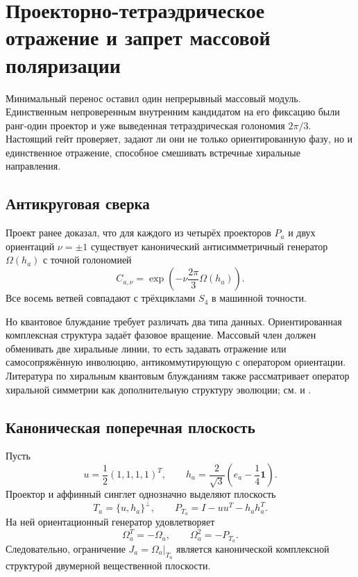 \chapter{Проекторно-тетраэдрическое отражение и запрет массовой поляризации}

Минимальный перенос оставил один непрерывный массовый модуль. Единственным
непроверенным внутренним кандидатом на его фиксацию были ранг-один проектор
и уже выведенная тетраэдрическая голономия $2\pi/3$. Настоящий гейт
проверяет, задают ли они не только ориентированную фазу, но и единственное
отражение, способное смешивать встречные хиральные направления.

\section{Антикруговая сверка}

Проект ранее доказал, что для каждого из четырёх проекторов $P_a$ и двух
ориентаций $\nu=\pm1$ существует канонический антисимметричный генератор
$\Omega(h_a)$ с точной голономией
\begin{equation}
 C_{a,\nu}=\exp\!\left(-\nu\frac{2\pi}{3}\Omega(h_a)\right).
 \label{eq:v5-tetra-holonomy}
\end{equation}
Все восемь ветвей совпадают с трёхциклами $S_4$ в машинной точности.

Но квантовое блуждание требует различать два типа данных. Ориентированная
комплексная структура задаёт фазовое вращение. Массовый член должен
обменивать две хиральные линии, то есть задавать отражение или
самосопряжённую инволюцию, антикоммутирующую с оператором ориентации.
Литература по хиральным квантовым блужданиям также рассматривает оператор
хиральной симметрии как дополнительную структуру эволюции; см.
 и .

\section{Каноническая поперечная плоскость}

Пусть
\begin{equation}
 u=\frac12(1,1,1,1)^T,
 \qquad
 h_a=\frac2{\sqrt3}\left(e_a-\frac14\mathbf1\right).
\end{equation}
Проектор и аффинный синглет однозначно выделяют плоскость
\begin{equation}
 T_a=\{u,h_a\}^{\perp},
 \qquad
 P_{T_a}=I-uu^T-h_ah_a^T.
\end{equation}
На ней ориентационный генератор удовлетворяет
\begin{equation}
 \Omega_a^T=-\Omega_a,
 \qquad
 \Omega_a^2=-P_{T_a}.
 \label{eq:v5-transverse-complex-structure}
\end{equation}
Следовательно, ограничение $J_a=\Omega_a|_{T_a}$ является канонической
комплексной структурой двумерной вещественной плоскости.

